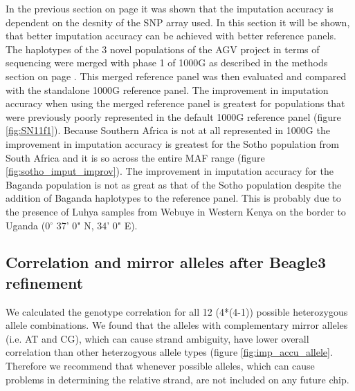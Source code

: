 In the previous section on page \pageref{subsec:thinning} it was shown that the imputation accuracy is dependent on the desnity of the \gls{SNP} array used. In this section it will be shown, that better imputation accuracy can be achieved with better reference panels.
The haplotypes of the 3 novel populations of the \gls{AGV} project\cite{Gurdasani2015} in terms of sequencing were merged with phase 1 of \gls{1000G} as described in the methods section on page \pageref{subsec:panel_merger}. This merged reference panel was then evaluated and compared with the standalone \gls{1000G} reference panel. The improvement in imputation accuracy when using the merged reference panel is greatest for populations that were previously poorly represented in the default \gls{1000G} reference panel (figure \ref{fig:SN11f1}). Because Southern Africa is not at all represented in \gls{1000G} the improvement in imputation accuracy is greatest for the Sotho population from South Africa and it is so across the entire \gls{MAF} range (figure \ref{fig:sotho_imput_improv}). The improvement in imputation accuracy for the Baganda population is not as great as that of the Sotho population despite the addition of Baganda haplotypes to the reference panel. This is probably due to the presence of Luhya samples from Webuye in Western Kenya on the border to Uganda (0$^{\circ}$ 37' 0" N, 34' 0" E).




\subsection{Correlation and mirror alleles after Beagle3 refinement}
We calculated the genotype correlation for all 12 (4*(4-1)) possible heterozygous allele combinations. We found that the alleles with complementary mirror alleles (i.e. AT and CG), which can cause strand ambiguity, have lower overall correlation than other heterzogyous allele types (figure \ref{fig:imp_accu_allele}. Therefore we recommend that whenever possible alleles, which can cause problems in determining the relative strand, are not included on any future chip.
